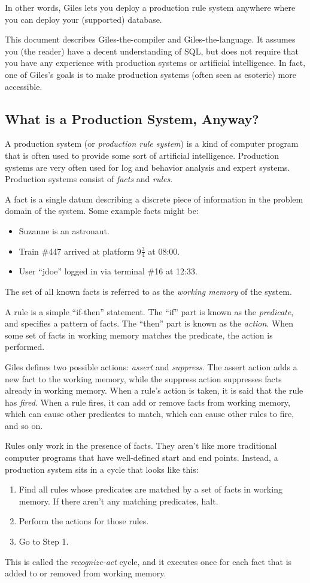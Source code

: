 \documentclass[letterpaper,10pt]{article}
\begin{document}
In other words, Giles lets you deploy a production rule system anywhere where you can deploy your (supported) database.

This document describes Giles-the-compiler and Giles-the-language.
It assumes you (the reader) have a decent understanding of SQL, but does not require that you have any experience with production systems or artificial intelligence.
In fact, one of Giles's goals is to make production systems (often seen as esoteric) more accessible.

\subsection{What is a Production System, Anyway?}
A production system (or \emph{production rule system}) is a kind of computer program that is often used to provide some sort of artificial intelligence.
Production systems are very often used for log and behavior analysis and expert systems.
Production systems consist of \emph{facts} and \emph{rules}.

A fact is a single datum describing a discrete piece of information in the problem domain of the system.
Some example facts might be:
\begin{itemize}
    \item Suzanne is an astronaut.
    \item Train \#447 arrived at platform 9$\frac{3}{4}$ at 08:00.
    \item User ``jdoe'' logged in via terminal \#16 at 12:33.
\end{itemize}
The set of all known facts is referred to as the \emph{working memory} of the system.

A rule is a simple ``if-then'' statement.
The ``if'' part is known as the \emph{predicate}, and specifies a pattern of facts.
The ``then'' part is known as the \emph{action}.
When some set of facts in working memory matches the predicate, the action is performed.

Giles defines two possible actions: \emph{assert} and \emph{suppress}.
The assert action adds a new fact to the working memory, while the suppress action suppresses facts already in working memory.
When a rule's action is taken, it is said that the rule has \emph{fired}.
When a rule fires, it can add or remove facts from working memory, which can cause other predicates to match, which can cause other rules to fire, and so on.

Rules only work in the presence of facts.
They aren't like more traditional computer programs that have well-defined start and end points.
Instead, a production system sits in a cycle that looks like this:
\begin{enumerate}[Step 1]
    \item Find all rules whose predicates are matched by a set of facts in working memory.
          If there aren't any matching predicates, halt.
    \item Perform the actions for those rules.
    \item Go to Step 1.
\end{enumerate}
This is called the \emph{recognize-act} cycle, and it executes once for each fact that is added to or removed from working memory.
\end{document}
